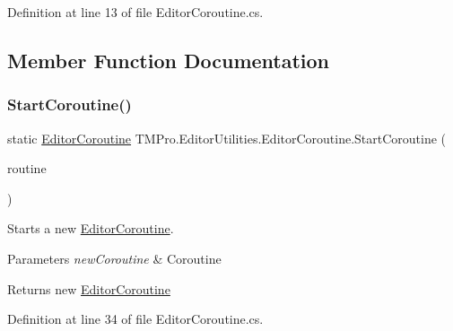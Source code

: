 Definition at line 13 of file Editor\+Coroutine.\+cs.



\subsection{Member Function Documentation}
\mbox{\label{class_t_m_pro_1_1_editor_utilities_1_1_editor_coroutine_abab6d5eb211e23d072db7181905df57b}} 
\subsubsection{\texorpdfstring{StartCoroutine()}{StartCoroutine()}}
{\footnotesize\ttfamily static \mbox{\hyperlink{class_t_m_pro_1_1_editor_utilities_1_1_editor_coroutine}{Editor\+Coroutine}} T\+M\+Pro.\+Editor\+Utilities.\+Editor\+Coroutine.\+Start\+Coroutine (\begin{DoxyParamCaption}\item[{I\+Enumerator}]{routine }\end{DoxyParamCaption})\hspace{0.3cm}{\ttfamily [static]}}



Starts a new \mbox{\hyperlink{class_t_m_pro_1_1_editor_utilities_1_1_editor_coroutine}{Editor\+Coroutine}}. 


\begin{DoxyParams}{Parameters}
{\em new\+Coroutine} & Coroutine\\
\hline
\end{DoxyParams}
\begin{DoxyReturn}{Returns}
new \mbox{\hyperlink{class_t_m_pro_1_1_editor_utilities_1_1_editor_coroutine}{Editor\+Coroutine}}
\end{DoxyReturn}


Definition at line 34 of file Editor\+Coroutine.\+cs.

\mbox{\label{class_t_m_pro_1_1_editor_utilities_1_1_editor_coroutine_ae67a02fa202696210a86e3172a423e7a}} 
